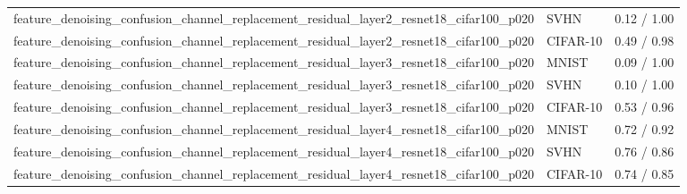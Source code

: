 \begin{tabular}{lll}
feature\_denoising\_confusion\_channel\_replacement\_residual\_layer2\_resnet18\_cifar100\_p020 & SVHN & 0.12 / 1.00 \\
feature\_denoising\_confusion\_channel\_replacement\_residual\_layer2\_resnet18\_cifar100\_p020 & CIFAR-10 & 0.49 / 0.98 \\
feature\_denoising\_confusion\_channel\_replacement\_residual\_layer3\_resnet18\_cifar100\_p020 & MNIST & 0.09 / 1.00 \\
feature\_denoising\_confusion\_channel\_replacement\_residual\_layer3\_resnet18\_cifar100\_p020 & SVHN & 0.10 / 1.00 \\
feature\_denoising\_confusion\_channel\_replacement\_residual\_layer3\_resnet18\_cifar100\_p020 & CIFAR-10 & 0.53 / 0.96 \\
feature\_denoising\_confusion\_channel\_replacement\_residual\_layer4\_resnet18\_cifar100\_p020 & MNIST & 0.72 / 0.92 \\
feature\_denoising\_confusion\_channel\_replacement\_residual\_layer4\_resnet18\_cifar100\_p020 & SVHN & 0.76 / 0.86 \\
feature\_denoising\_confusion\_channel\_replacement\_residual\_layer4\_resnet18\_cifar100\_p020 & CIFAR-10 & 0.74 / 0.85 \\
\bottomrule
\end{tabular}
